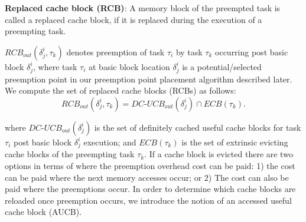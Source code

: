 \begin{definition}
\textbf{Replaced cache block (RCB)}: A memory block of the preempted task is called a replaced cache block, if it is replaced during the execution of a preempting task.
\end{definition}

\noindent \begin{math}\textit{RCB}_{out}(\delta_{j}^{i},\tau_{k})\end{math} denotes preemption of task \begin{math}\tau_{i}\end{math} by task \begin{math}\tau_{k}\end{math} occurring post basic block \begin{math}\delta_{j}^{i}\end{math}, where task \begin{math}\tau_{i}\end{math} at basic block location \begin{math}\delta_{j}^{i}\end{math} is a potential/selected preemption point in our preemption point placement algorithm described later.  We compute the set of replaced cache blocks (RCBs) as follows:
\begin{equation}\label{eqn:rcb-formula}
    \textit{RCB}_{out}(\delta_{j}^{i},\tau_{k}) = \textit{DC-UCB}_{out}(\delta_{j}^{i}) \cap \textit{ECB}(\tau_{k}).
\end{equation}

\noindent where \begin{math}\textit{DC-UCB}_{out}(\delta_{j}^{i})\end{math} is the set of definitely cached useful cache blocks for task \begin{math}\tau_{i}\end{math} post basic block \begin{math}\delta_{j}^{i}\end{math} execution; and \begin{math}\textit{ECB}(\tau_{k})\end{math} is the set of extrinsic evicting cache blocks of the preempting task \begin{math}\tau_{k}\end{math}.
\newline
\newline
If a cache block is evicted there are two options in terms of where the preemption overhead cost can be paid: 1) the cost can be paid where the next memory accesses occur; or 2) The cost can also be paid where the preemptions occur.  In order to determine which cache blocks are reloaded once preemption occurs, we introduce the notion of an accessed useful cache block (AUCB).

